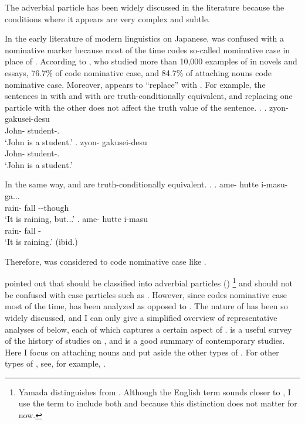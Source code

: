 The adverbial particle  has been widely discussed in the literature
because the conditions where it appears are very complex and subtle.

In the early literature of modern linguistics on Japanese,
 was confused with a nominative marker
because most of the time  codes so-called nominative case in place of .
According to ,
who studied more than 10,000 examples of 
in novels and essays,
76.7\% of  code nominative case, and
84.7\% of  attaching nouns code nominative case.
Moreover,
 appears to ``replace'' with .
For example,
the sentences in \Next[a] with  and \Next[b] with 
are truth-conditionally equivalent, and
replacing one particle with the other does not affect the truth value
of the sentence.
%
\ex.
 \ag. zyon- gakusei-desu \\
      John- student-. \\
      `John is a student.'
 \bg. zyon- gakusei-desu \\
      John- student-. \\
      `John is a student.'
      \hfill{\cite[p.~38]{kuno73}}

In the same way,
\Next[a] and \Next[b] are truth-conditionally equivalent.
%
\ex.
 \ag. ame- hutte i-masu-ga... \\
      rain- fall --though \\
      `It is raining, but...'
 \bg. ame- hutte i-masu \\
      rain- fall - \\
      `It is raining.'
      \hfill{(ibid.)}

Therefore,  was considered to code nominative case like .

 pointed out that
 should be classified into adverbial particles ()%
 \footnote{
 Yamada distinguishes  from .
 Although the English term  sounds closer to
 ,
 I use the term  to include both
  and 
 because this distinction does not matter for now. 
 }
and should not be confused with case particles such as .
However, since  codes nominative case most of the time,
 has been analyzed as opposed to .
The nature of  has been so widely discussed, and
I can only give a simplified overview of representative analyses of  below,
each of which captures a certain aspect of .
 is a useful survey of the history of studies on ,
and  is a good summary of contemporary studies.
Here I focus on  attaching nouns and put aside the other types of .
For other types of ,
see, for example, .


